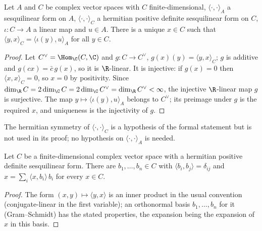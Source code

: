 \begin{lemma}\label{pf:sh-siegel:adjoint}
Let $A$ and $C$ be complex vector spaces with $C$ finite-dimensional, $\langle\cdot,\cdot\rangle_A$ a sesquilinear form on
$A$, $\langle\cdot,\cdot\rangle_C$ a hermitian positive definite sesquilinear form on $C$, $\iota\colon C\to A$ a linear map
and $u\in A$. There is a unique $x\in C$ such that $\langle y,x\rangle_C=\langle\iota(y),u\rangle_A$ for all $y\in C$.
\end{lemma}

\begin{proof}
Let $C^\vee=\Hom_\C(C,\C)$ and $g\colon C\to C^\vee$, $g(x)(y)=\langle y,x\rangle_C$; $g$ is additive and
$g(cx)=\bar c\,g(x)$, so it is $\R$-linear. It is injective: if $g(x)=0$ then $\langle x,x\rangle_C=0$, so $x=0$ by
positivity. Since $\dim_\R C=2\dim_\C C=2\dim_\C C^\vee=\dim_\R C^\vee<\infty$, the injective $\R$-linear map $g$ is
surjective. The map $y\mapsto\langle\iota(y),u\rangle_A$ belongs to $C^\vee$; its preimage under $g$ is the required $x$,
and uniqueness is the injectivity of $g$.
\end{proof}

\begin{remark}\label{pf:sh-siegel:adjointrem}
The hermitian symmetry of $\langle\cdot,\cdot\rangle_C$ is a hypothesis of the formal statement but is not used in its
proof; no hypothesis on $\langle\cdot,\cdot\rangle_A$ is needed.
\end{remark}

\begin{lemma}\label{pf:sh-siegel:onb}
Let $C$ be a finite-dimensional complex vector space with a hermitian positive definite sesquilinear form. There are
$b_1,\dots,b_n\in C$ with $\langle b_i,b_j\rangle=\delta_{ij}$ and $x=\sum_i\langle x,b_i\rangle\,b_i$ for every $x\in C$.
\end{lemma}

\begin{proof}
The form $(x,y)\mapsto\langle y,x\rangle$ is an inner product in the usual convention (conjugate-linear in the first
variable); an orthonormal basis $b_1,\dots,b_n$ for it (Gram--Schmidt) has the stated properties, the expansion being the
expansion of $x$ in this basis.
\end{proof}

